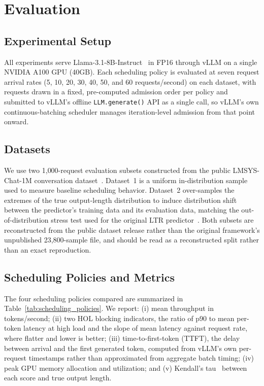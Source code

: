 \section{Evaluation}
\label{sec:evaluation}

\subsection{Experimental Setup}
\label{subsec:setup}

All experiments serve Llama-3.1-8B-Instruct~\cite{dubey2024llama3} in FP16
through vLLM on a single NVIDIA A100 GPU (40GB). Each scheduling policy is
evaluated at seven request arrival rates (5, 10, 20, 30, 40, 50, and 60
requests/second) on each dataset, with requests drawn in a fixed,
pre-computed admission order per policy and submitted to vLLM's offline
\texttt{LLM.generate()} API as a single call, so vLLM's own
continuous-batching scheduler manages iteration-level admission from that
point onward.

\subsection{Datasets}
\label{subsec:datasets}

We use two 1{,}000-request evaluation subsets constructed from the public
LMSYS-Chat-1M conversation dataset~\cite{zheng2023lmsyschat}. Dataset~1 is a
uniform in-distribution sample used to measure baseline scheduling behavior.
Dataset~2 over-samples the extremes of the true output-length distribution to
induce distribution shift between the predictor's training data and its
evaluation data, matching the out-of-distribution stress test used for the
original LTR predictor~\cite{fu2024efficient}. Both subsets are reconstructed
from the public dataset release rather than the original framework's
unpublished 23{,}800-sample file, and should be read as a reconstructed split
rather than an exact reproduction.

\subsection{Scheduling Policies and Metrics}
\label{subsec:policies-metrics}

The four scheduling policies compared are summarized in
Table~\ref{tab:scheduling_policies}. We report: (i) mean throughput in
tokens/second; (ii) two HOL blocking indicators, the ratio of p90 to mean
per-token latency at high load and the slope of mean latency against request
rate, where flatter and lower is better; (iii) time-to-first-token (TTFT),
the delay between arrival and the first generated token, computed from
vLLM's own per-request timestamps rather than approximated from aggregate
batch timing; (iv) peak GPU memory allocation and utilization; and (v)
Kendall's tau~\cite{kendall1938new} between each score and true output
length.

